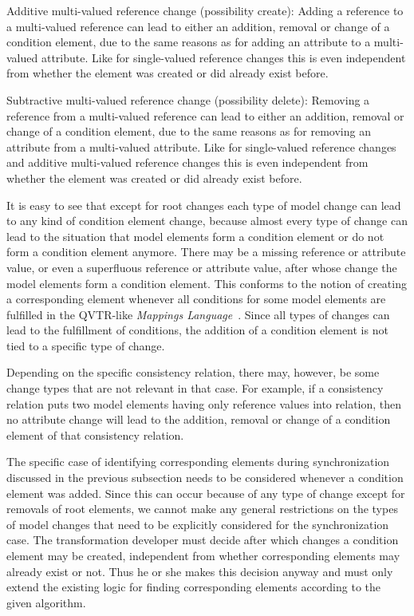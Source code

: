 \begin{properdescription}
    \item[Additive multi-valued reference change (possibility create):] Adding a reference to a multi-valued reference can lead to either an addition, removal or change of a condition element, due to the same reasons as for adding an attribute to a multi-valued attribute. Like for single-valued reference changes this is even independent from whether the element was created or did already exist before.
    \item[Subtractive multi-valued reference change (possibility delete):] Removing a reference from a multi-valued reference can lead to either an addition, removal or change of a condition element, due to the same reasons as for removing an attribute from a multi-valued attribute. Like for single-valued reference changes and additive multi-valued reference changes this is even independent from whether the element was created or did already exist before.
\end{properdescription}

It is easy to see that except for root changes each type of model change can lead to any kind of condition element change, because almost every type of change can lead to the situation that model elements form a condition element or do not form a condition element anymore.
There may be a missing reference or attribute value, or even a superfluous reference or attribute value, after whose change the model elements form a condition element.
This conforms to the notion of creating a corresponding element whenever all conditions for some model elements are fulfilled in the \gls{QVTR}-like \emph{Mappings Language}~\cite[p. 283]{kramer2017a}.
Since all types of changes can lead to the fulfillment of conditions, the addition of a condition element is not tied to a specific type of change.

Depending on the specific consistency relation, there may, however, be some change types that are not relevant in that case.
For example, if a consistency relation puts two model elements having only reference values into relation, then no attribute change will lead to the addition, removal or change of a condition element of that consistency relation.

The specific case of identifying corresponding elements during synchronization discussed in the previous subsection needs to be considered whenever a condition element was added.
Since this can occur because of any type of change except for removals of root elements, we cannot make any general restrictions on the types of model changes that need to be explicitly considered for the synchronization case.
The transformation developer must decide after which changes a condition element may be created, independent from whether corresponding elements may already exist or not.
Thus he or she makes this decision anyway and must only extend the existing logic for finding corresponding elements according to the given algorithm.

